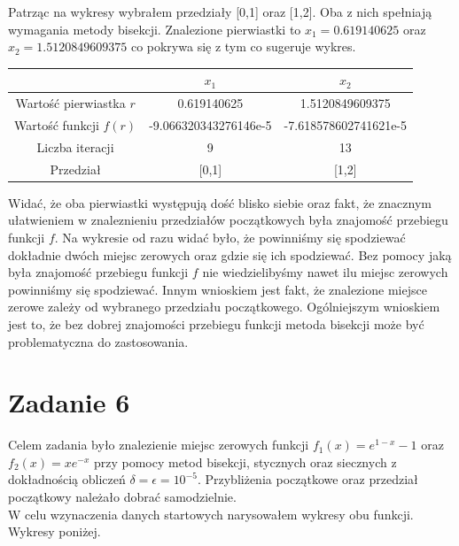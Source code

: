\documentclass[]{article}
\begin{document}
	Patrząc na wykresy wybrałem przedziały [0,1] oraz [1,2]. Oba z nich spełniają wymagania metody bisekcji. Znalezione pierwiastki to $x_1=0.619140625$ oraz $x_2=1.5120849609375$ co pokrywa się z tym co sugeruje wykres.
	
	
	\begin{table}[!h]
		\centering
		\label{tab:table1}
		\begin{tabular}{c|c|c}
			
			 & $x_1$ & $x_2$ \\ \hline
			Wartość pierwiastka $r$ &  0.619140625 & 1.5120849609375 \\ 
			Wartość funkcji $f(r)$ & -9.066320343276146e-5 & -7.618578602741621e-5  \\ 
			Liczba iteracji & 9 & 13 \\
			Przedział & [0,1] & [1,2] \\
		\end{tabular}
	\end{table}

	Widać, że oba pierwiastki występują dość blisko siebie oraz fakt, że znacznym ułatwieniem w znaleznieniu przedziałów początkowych była znajomość przebiegu funkcji $f$. Na wykresie od razu widać było, że powinniśmy się spodziewać dokładnie dwóch miejsc zerowych oraz gdzie się ich spodziewać. Bez pomocy jaką była znajomość przebiegu funkcji $f$ nie wiedzielibyśmy nawet ilu miejsc zerowych powinniśmy się spodziewać. Innym wnioskiem jest fakt, że znalezione miejsce zerowe zależy od wybranego przedziału początkowego. Ogólniejszym wnioskiem jest to, że bez dobrej znajomości przebiegu funkcji metoda bisekcji może być problematyczna do zastosowania. 

	\clearpage
	
	\section*{Zadanie 6}
	
	Celem zadania było znalezienie miejsc zerowych funkcji $f_1(x)=e^{1-x}-1$ oraz $f_2(x)=xe^{-x}$ przy pomocy metod bisekcji, stycznych oraz siecznych z dokładnością obliczeń $\delta=\epsilon=10^{-5}$. Przybliżenia początkowe oraz przedział początkowy należało dobrać samodzielnie.\\
	W celu wzynaczenia danych startowych narysowałem wykresy obu funkcji. Wykresy poniżej.
\end{document}

